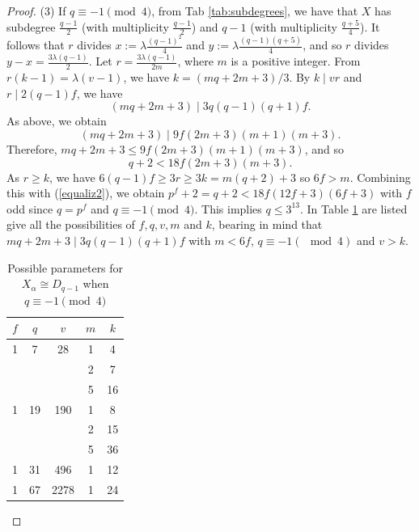 \documentclass[a4paper,twopage,reqno,12pt]{amsart}
\theoremstyle{definition}
\numberwithin{equation}{section}
\renewcommand{\leq}{\leqslant}
\renewcommand{\geq}{\geqslant}
\begin{document}
\begin{proof}
(3) If $q\equiv -1 \pmod{4}$, from Tab \ref{tab:subdegrees}, 
we have that $X$ has subdegree $\frac{q-1}{2}$ (with multiplicity $\frac{q-1}{2}$) and $q-1$ (with multiplicity $\frac{q+5}{4}$). It follows that $r$ divides $x:=\lambda \frac{(q-1)^2}{4}$ and $y:=\lambda \frac{(q-1)(q+5)}{4}$,
and so $r$ divides $y-x=\frac{3\lambda(q-1)}{2}$.
Let $r=\frac{3\lambda(q-1)}{2m}$, where $m$ is a positive integer.
From $r(k-1)=\lambda(v-1)$, we have $k=(mq+2m+3)/3$.
By $k\mid vr$ and $r\mid 2(q-1)f$,  we have 
\[
(mq+2m+3)\mid 3q(q-1)(q+1)f.
\]
As above,
we obtain $$(mq+2m+3) \mid 9f(2m+3)(m+1)(m+3)\text{.}$$
Therefore, $mq+2m+3 \le 9f(2m+3)(m+1)(m+3)$, and so  
\begin{equation}\label{equaliz2}
q+2 < 18f(2m+3)(m+3)\text{.}    
\end{equation}
As $r\geq k$, we have
$6(q-1)f\geq 3r\geq 3k=m(q+2)+3$ 
so $6f>m$.
Combining this with (\ref{equaliz2}), we obtain $p^{f}+2 = q+2 < 18f(12f+3)(6f+3)$ with $f$ odd since $q=p^{f}$ and $q\equiv -1 \pmod{4}$. This implies $q\leq 3^{13}$. In Table \ref{tab:q_mod_3-} are listed give all the possibilities of $f,q,v,m$ and $k$, bearing in mind that $mq+2m+3\mid 3q(q-1)(q+1)f$ with $m<6f$, $q\equiv -1 (\mod 4)$ and $v>k$.
\begin{table}[htbp]
\tiny
    \centering
    \caption{Possible parameters for $X_\alpha \cong D_{q-1}$ when $q \equiv -1 \pmod 4$}
    \label{tab:q_mod_3-}
    \begin{tabular}{ccccc}
        \toprule
        $f$ & $q$ & $v$ & $m$ & $k$ \\
        \midrule
        1 & 7 & 28 & 1 & 4 \\
          &   &    & 2 & 7 \\
         &   &    & 5 & 16 \\         
        [1ex]
        1 & 19 & 190 & 1 & 8 \\
          &    &     & 2 & 15 \\
          &   &    & 5 & 36 \\         
        [1ex]
        1 & 31 & 496 & 1 & 12 \\
        [1ex]
        1 & 67 & 2278 & 1 & 24 \\

\end{tabular}
\end{table}
\end{proof}
\end{document}
